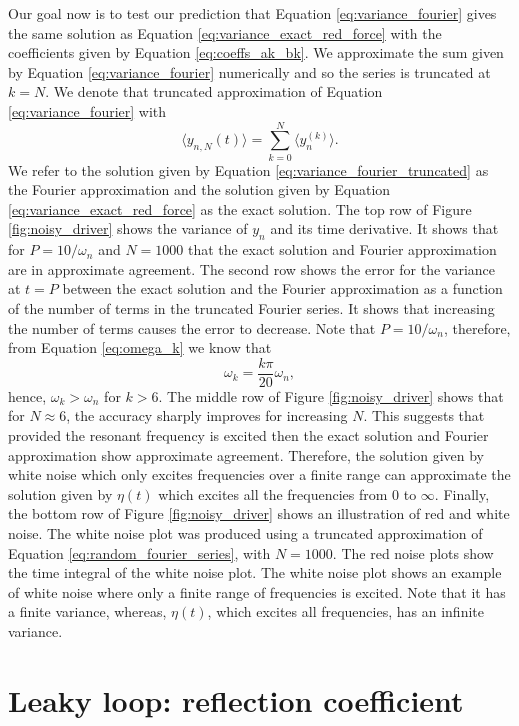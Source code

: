 Our goal now is to test our prediction that Equation \eqref{eq:variance_fourier} gives the same solution as Equation \eqref{eq:variance_exact_red_force} with the coefficients given by Equation \eqref{eq:coeffs_ak_bk}. We approximate the sum given by Equation \eqref{eq:variance_fourier} numerically and so the series is truncated at $k=N$. We denote that truncated approximation of Equation \eqref{eq:variance_fourier} with
\begin{equation}
    \label{eq:variance_fourier_truncated}
    \langle y_{n,N}(t) \rangle =\sum_{k=0}^N \langle y_n^{(k)} \rangle.
\end{equation}
We refer to the solution given by Equation \eqref{eq:variance_fourier_truncated} as the Fourier approximation and the solution given by Equation \eqref{eq:variance_exact_red_force} as the exact solution. The top row of Figure \ref{fig:noisy_driver} shows the variance of $y_n$ and its time derivative. It shows that for $P=10/\omega_n$ and $N=1000$ that the exact solution and Fourier approximation are in approximate agreement. The second row shows the error for the variance at $t=P$ between the exact solution and the Fourier approximation as a function of the number of terms in the truncated Fourier series. It shows that increasing the number of terms causes the error to decrease. Note that $P=10/\omega_n$, therefore, from Equation \eqref{eq:omega_k} we know that
\[\omega_k = \frac{k\pi}{20}\omega_n,\]
hence, $\omega_k>\omega_n$ for $k>6$.
The middle row of Figure \ref{fig:noisy_driver} shows that for $N\approx6$, the accuracy sharply improves for increasing $N$. This suggests that provided the resonant frequency is excited then the exact solution and Fourier approximation show approximate agreement. Therefore, the solution given by white noise which only excites frequencies over a finite range can approximate the solution given by $\eta(t)$ which excites all the frequencies from 0 to $\infty$. Finally, the bottom row of Figure \ref{fig:noisy_driver} shows an illustration of red and white noise. The white noise plot was produced using a truncated approximation of Equation \eqref{eq:random_fourier_series}, with $N=1000$. The red noise plots show the time integral of the white noise plot. The white noise plot shows an example of white noise where only a finite range of frequencies is excited. Note that it has a finite variance, whereas, $\eta(t)$, which excites all frequencies, has an infinite variance.

\section{Leaky loop: reflection coefficient}
\label{sec:leaky_loop_reflection_coefficent}

